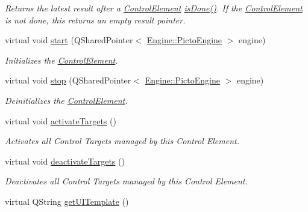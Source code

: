 \begin{DoxyCompactItemize}
\begin{DoxyCompactList}\small\item\em Returns the latest result after a \hyperlink{class_picto_1_1_control_element}{Control\-Element} \hyperlink{class_picto_1_1_control_element_acf73c056833f5da319a0ae046b82b3a8}{is\-Done()}. If the \hyperlink{class_picto_1_1_control_element}{Control\-Element} is not done, this returns an empty result pointer. \end{DoxyCompactList}\item 
virtual void \hyperlink{class_picto_1_1_control_element_a29316418d618837adeebf47bb8d58308}{start} (Q\-Shared\-Pointer$<$ \hyperlink{class_picto_1_1_engine_1_1_picto_engine}{Engine\-::\-Picto\-Engine} $>$ engine)
\begin{DoxyCompactList}\small\item\em Initializes the \hyperlink{class_picto_1_1_control_element}{Control\-Element}. \end{DoxyCompactList}\item 
virtual void \hyperlink{class_picto_1_1_control_element_ad373499cb9f2b816627954d49e12de19}{stop} (Q\-Shared\-Pointer$<$ \hyperlink{class_picto_1_1_engine_1_1_picto_engine}{Engine\-::\-Picto\-Engine} $>$ engine)
\begin{DoxyCompactList}\small\item\em Deinitializes the \hyperlink{class_picto_1_1_control_element}{Control\-Element}. \end{DoxyCompactList}\item 
virtual void \hyperlink{class_picto_1_1_control_element_ac660682acd7da329220cc7c4d7a9d825}{activate\-Targets} ()
\begin{DoxyCompactList}\small\item\em Activates all Control Targets managed by this Control Element. \end{DoxyCompactList}\item 
virtual void \hyperlink{class_picto_1_1_control_element_ac5d3e0d806747e930702b2444509ce82}{deactivate\-Targets} ()
\begin{DoxyCompactList}\small\item\em Deactivates all Control Targets managed by this Control Element. \end{DoxyCompactList}\item 
\hypertarget{class_picto_1_1_control_element_ac844e4681f31c3f11a26a686905c2316}{virtual Q\-String \hyperlink{class_picto_1_1_control_element_ac844e4681f31c3f11a26a686905c2316}{get\-U\-I\-Template} ()}\label{class_picto_1_1_control_element_ac844e4681f31c3f11a26a686905c2316}


\end{DoxyCompactItemize}
